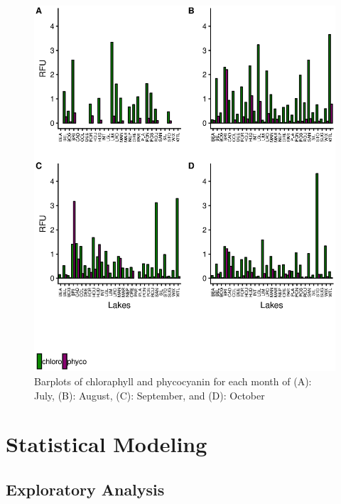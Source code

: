 \begin{figure}[!h]
	\includegraphics[width=\textwidth]{figures/floro}
	\caption{
Barplots of chloraphyll and phycocyanin	for each month of 
(A): July, 
(B): August,
(C): September, and
(D): October 
}
	\label{fig:floro}
\end{figure}

\clearpage




\section{Statistical Modeling}
\subsection{Exploratory Analysis}

